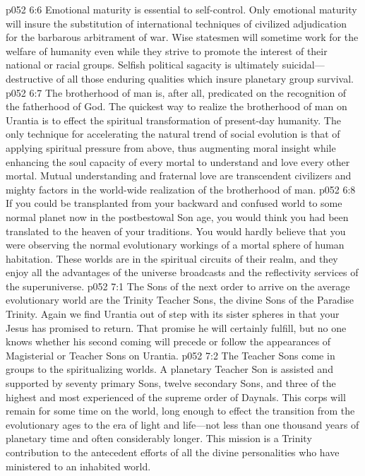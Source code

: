 \pc \vs p052 6:6 \bibnobreakspace {} Emotional maturity is essential to self\hyp{}control. Only emotional maturity will insure the substitution of international techniques of civilized adjudication for the barbarous arbitrament of war. Wise statesmen will sometime work for the welfare of humanity even while they strive to promote the interest of their national or racial groups. Selfish political sagacity is ultimately suicidal---destructive of all those enduring qualities which insure planetary group survival.
\pc \vs p052 6:7 \bibnobreakspace {} The brotherhood of man is, after all, predicated on the recognition of the fatherhood of God. The quickest way to realize the brotherhood of man on Urantia is to effect the spiritual transformation of present\hyp{}day humanity. The only technique for accelerating the natural trend of social evolution is that of applying spiritual pressure from above, thus augmenting moral insight while enhancing the soul capacity of every mortal to understand and love every other mortal. Mutual understanding and fraternal love are transcendent civilizers and mighty factors in the world\hyp{}wide realization of the brotherhood of man.
\pc \vs p052 6:8 If you could be transplanted from your backward and confused world to some normal planet now in the postbestowal Son age, you would think you had been translated to the heaven of your traditions. You would hardly believe that you were observing the normal evolutionary workings of a mortal sphere of human habitation. These worlds are in the spiritual circuits of their realm, and they enjoy all the advantages of the universe broadcasts and the reflectivity services of the superuniverse.\plusone
{}
\vs p052 7:1 The Sons of the next order to arrive on the average evolutionary world are the Trinity Teacher Sons, the divine Sons of the Paradise Trinity. Again we find Urantia out of step with its sister spheres in that your Jesus has promised to return. That promise he will certainly fulfill, but no one knows whether his second coming will precede or follow the appearances of Magisterial or Teacher Sons on Urantia.
\vs p052 7:2 The Teacher Sons come in groups to the spiritualizing worlds. A planetary Teacher Son is assisted and supported by seventy primary Sons, twelve secondary Sons, and three of the highest and most experienced of the supreme order of Daynals. This corps will remain for some time on the world, long enough to effect the transition from the evolutionary ages to the era of light and life---not less than one thousand years of planetary time and often considerably longer. This mission is a Trinity contribution to the antecedent efforts of all the divine personalities who have ministered to an inhabited world.
